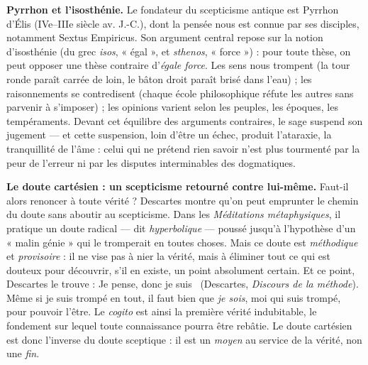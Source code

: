 \documentclass[11pt]{article}
\newcommand{\cle}[1]{{\popxbold\color{popdark}#1}}
\begin{document}
\textbf{Pyrrhon et l'isosthénie.} Le fondateur du scepticisme antique est Pyrrhon d'Élis (IVe--IIIe siècle av. J.-C.), dont la pensée nous est connue par ses disciples, notamment Sextus Empiricus. Son argument central repose sur la notion d'\cle{isosthénie} (du grec \emph{isos}, « égal », et \emph{sthenos}, « force ») : pour toute thèse, on peut opposer une thèse contraire d'\emph{égale force}. Les sens nous trompent (la tour ronde paraît carrée de loin, le bâton droit paraît brisé dans l'eau) ; les raisonnements se contredisent (chaque école philosophique réfute les autres sans parvenir à s'imposer) ; les opinions varient selon les peuples, les époques, les tempéraments. Devant cet équilibre des arguments contraires, le sage suspend son jugement — et cette suspension, loin d'être un échec, produit l'\cle{ataraxie}, la tranquillité de l'âme : celui qui ne prétend rien savoir n'est plus tourmenté par la peur de l'erreur ni par les disputes interminables des dogmatiques.

\textbf{Le doute cartésien : un scepticisme retourné contre lui-même.} Faut-il alors renoncer à toute vérité ? Descartes montre qu'on peut emprunter le chemin du doute sans aboutir au scepticisme. Dans les \emph{Méditations métaphysiques}, il pratique un doute radical — dit \emph{hyperbolique} — poussé jusqu'à l'hypothèse d'un « malin génie » qui le tromperait en toutes choses. Mais ce doute est \emph{méthodique} et \emph{provisoire} : il ne vise pas à nier la vérité, mais à éliminer tout ce qui est douteux pour découvrir, s'il en existe, un point absolument certain. Et ce point, Descartes le trouve : \guillemotleft Je pense, donc je suis \guillemotright\ (Descartes, \emph{Discours de la méthode}). Même si je suis trompé en tout, il faut bien que \emph{je sois}, moi qui suis trompé, pour pouvoir l'être. Le \emph{cogito} est ainsi la première vérité indubitable, le fondement sur lequel toute connaissance pourra être rebâtie. Le doute cartésien est donc l'inverse du doute sceptique : il est un \emph{moyen} au service de la vérité, non une \emph{fin}.
\end{document}
